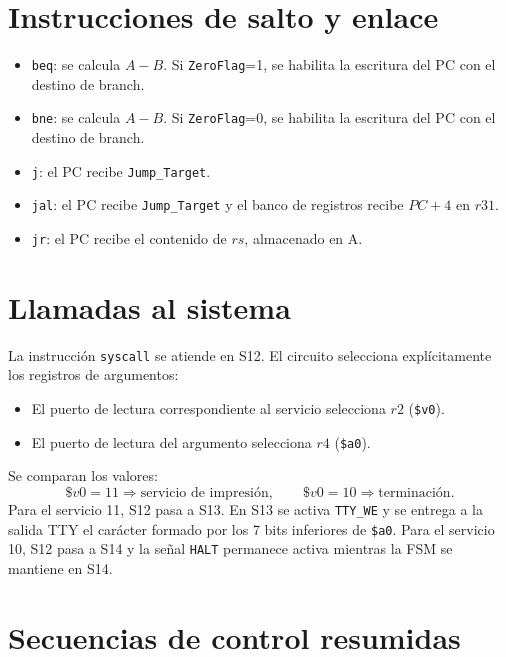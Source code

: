 \documentclass[11pt,a4paper]{article}
\begin{document}
\section{Instrucciones de salto y enlace}

\begin{itemize}
  \item \texttt{beq}: se calcula $A-B$. Si \texttt{ZeroFlag}=1, se habilita la escritura del PC con el destino de branch.
  \item \texttt{bne}: se calcula $A-B$. Si \texttt{ZeroFlag}=0, se habilita la escritura del PC con el destino de branch.
  \item \texttt{j}: el PC recibe \texttt{Jump\_Target}.
  \item \texttt{jal}: el PC recibe \texttt{Jump\_Target} y el banco de registros recibe $PC+4$ en $r31$.
  \item \texttt{jr}: el PC recibe el contenido de $rs$, almacenado en A.
\end{itemize}

\section{Llamadas al sistema}

La instrucción \texttt{syscall} se atiende en S12. El circuito selecciona explícitamente los registros de argumentos:
\begin{itemize}
  \item El puerto de lectura correspondiente al servicio selecciona $r2$ (\texttt{\$v0}).
  \item El puerto de lectura del argumento selecciona $r4$ (\texttt{\$a0}).
\end{itemize}

Se comparan los valores:
\[
  \$v0=11 \Rightarrow \text{servicio de impresión},
  \qquad
  \$v0=10 \Rightarrow \text{terminación}.
\]
Para el servicio 11, S12 pasa a S13. En S13 se activa \texttt{TTY\_WE} y se entrega a la salida TTY el carácter formado por los 7 bits inferiores de \texttt{\$a0}. Para el servicio 10, S12 pasa a S14 y la señal \texttt{HALT} permanece activa mientras la FSM se mantiene en S14.

\section{Secuencias de control resumidas}
\end{document}
